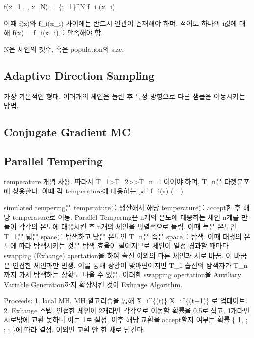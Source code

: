\documentclass[
]{book}
\begin{document}
f(x\_1 , \cdots, x\_N)=\prod\_\{i=1\}\^{}N f\_i (x\_i)

이때 f(x)와 f\_i(x\_i) 사이에는 반드시 연관이 존재해야 하며, 적어도 하나의 i값에 대해 f(x) = f\_i(x\_i)를 만족해야 함.

N은 체인의 갯수, 혹은 population의 size.

\hypertarget{adaptive-direction-sampling}{%
\subsection{Adaptive Direction Sampling}\label{adaptive-direction-sampling}}

가장 기본적인 형태. 여러개의 체인을 돌린 후 특정 방향으로 다른 샘플을 이동시키는 방법.

\hypertarget{conjugate-gradient-mc}{%
\subsection{Conjugate Gradient MC}\label{conjugate-gradient-mc}}

\hypertarget{parallel-tempering}{%
\subsection{Parallel Tempering}\label{parallel-tempering}}

temperature 개념 사용. 따라서 T\_1\textgreater T\_2\textgreater{}\cdots\textgreater T\_n=1 이어야 하며, T\_n은 타겟분포에 상응한다. 이때 각 temperature에 대응하는 pdf f\_i(x) \propto \exp \left( - \right)

simulated tempering은 temperature를 생산해서 해당 temperature를 accept한 후 해당 temperature로 이동.
Parallel Tempering은 n개의 온도에 대응하는 체인 n개를 만들어 각각의 온도에 대응시킨 후 n개의 체인을 병렬적으로 돌림. 이때 높은 온도인 T\_1은 넓은 space를 탐색하고 낮은 온도인 T\_n은 좁은 space를 탐색. 이때 태생의 온도에 따라 탐색시키는 것은 탐색 효율이 떨어지므로 체인이 일정 경과할 때마다 swapping (Exhange) opertation을 하여 출신 이외의 다른 체인과 서로 바꿈. 이 바꿈은 인접한 체인과만 발생. 이를 통해 상황이 맞아떨어지면 T\_1 출신의 탐색자가 T\_n까지 가서 탐색하는 상황도 나올 수 있음. 이러한 swapping opertation을 Auxiliary Variable Generation까지 확장시킨 것이 Exhange Algorithm.

Proceeds:
1. local MH. MH 알고리즘을 통해 X\_i\^{}\{(t)\} \rightarrow X\_i\^{}\{(t+1)\} 로 업데이트.
2. Exhange 스텝. 인접한 체인이 2개라면 각각으로 이동할 확률을 0.5로 잡고, 1개라면 서로밖에 교환 못하니 이는 1로 설정. 이후 해당 교환을 accept할지 여부는 확률 \min \left\{ 1, ; ; ; \exp {} \right\}에 따라 결정. 이외면 교환 안 한 채로 남긴다.
\end{document}
